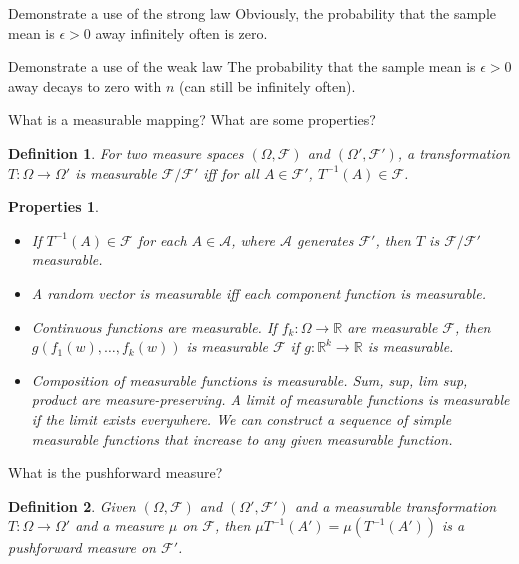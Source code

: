\documentclass[avery5388,grid,frame]{flashcards}
\newcommand{\R}{\mathbb{R}}
\newcommand{\F}{\mathcal F}
\newtheorem*{definition}{Definition}
\newtheorem*{properties}{Properties}
\begin{document}
\begin{flashcard}
    {Demonstrate a use of the strong law}
    Obviously, the probability that the sample mean is $\epsilon > 0$ away infinitely often is zero.
\end{flashcard}


\begin{flashcard}
    {Demonstrate a use of the weak law}
    The probability that the sample mean is $\epsilon > 0$ away decays to zero with $n$ (can still be infinitely often).
\end{flashcard}


\begin{flashcard}
    {What is a measurable mapping? What are some properties?}
    \begin{definition}
        For two measure spaces $(\Omega, \F)$ and $(\Omega', \F')$, a transformation $T: \Omega \rightarrow \Omega'$ is measurable $\F / \F'$ iff for all $A \in \F'$, $T^{-1}(A) \in \F$.
    \end{definition}

    \begin{properties}
        \begin{itemize}
            \item If $T^{-1}(A) \in \F$ for each $A \in \mathcal A$, where $\mathcal A$ generates $\F'$, then $T$ is $\F / \F'$ measurable.
            \item A random vector is measurable iff each component function is measurable.
            \item Continuous functions are measurable. If $f_k: \Omega \rightarrow \R$ are measurable $\F$, then $g(f_1(w),\dots,f_k(w))$ is measurable $\F$ if $g: \R^k \rightarrow \R$ is measurable.
            \item Composition of measurable functions is measurable. Sum, sup, lim sup, product are measure-preserving. A limit of measurable functions is measurable if the limit exists everywhere. We can construct a sequence of simple measurable functions that increase to any given measurable function.
        \end{itemize}
    \end{properties}
\end{flashcard}


\begin{flashcard}
    {What is the pushforward measure?}
    \begin{definition}
        Given $(\Omega, \F)$ and $(\Omega',\F')$ and a measurable transformation $T:\Omega \rightarrow \Omega'$ and a measure $\mu$ on $\F$, then $\mu T^{-1}(A') = \mu (T^{-1}(A'))$ is a pushforward measure on $\F'$.
    \end{definition}
\end{flashcard}
\end{document}
